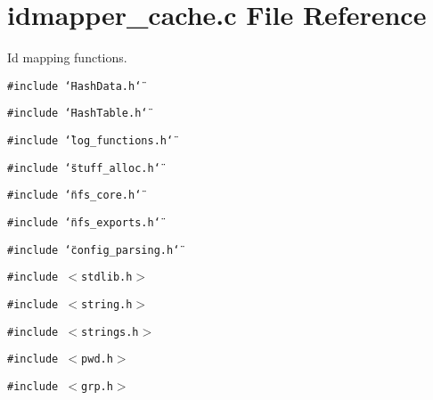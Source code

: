 \section{idmapper\_\-cache.c File Reference}
\label{idmapper__cache_8c}
Id mapping functions. 

{\tt \#include \char`\"{}Hash\-Data.h\char`\"{}}\par
{\tt \#include \char`\"{}Hash\-Table.h\char`\"{}}\par
{\tt \#include \char`\"{}log\_\-functions.h\char`\"{}}\par
{\tt \#include \char`\"{}stuff\_\-alloc.h\char`\"{}}\par
{\tt \#include \char`\"{}nfs\_\-core.h\char`\"{}}\par
{\tt \#include \char`\"{}nfs\_\-exports.h\char`\"{}}\par
{\tt \#include \char`\"{}config\_\-parsing.h\char`\"{}}\par
{\tt \#include $<$stdlib.h$>$}\par
{\tt \#include $<$string.h$>$}\par
{\tt \#include $<$strings.h$>$}\par
{\tt \#include $<$pwd.h$>$}\par
{\tt \#include $<$grp.h$>$}\par
